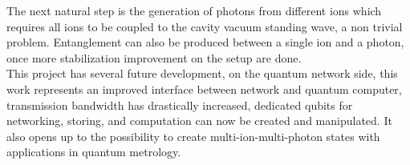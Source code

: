 The next natural step is the generation of photons from different ions which requires all ions to be coupled to the cavity vacuum standing wave, a non trivial problem. Entanglement can also be produced between a single ion and a photon, once more stabilization improvement on the setup are done.\\
This project has several future development, on the quantum network side, this work represents an improved interface between network and quantum computer, transmission bandwidth has drastically increased, dedicated qubits for networking, storing, and computation can now be created and manipulated. It also opens up to the possibility to create multi-ion-multi-photon states with applications in quantum metrology.
